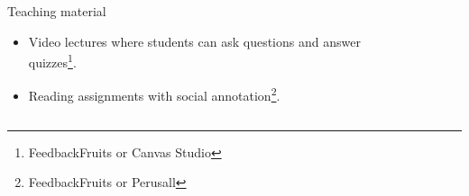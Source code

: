 \begin{frame}
  \begin{columns}
    \begin{column}{0.5\columnwidth}
      \begin{block}{Teaching material}
        \begin{itemize}
          \item<1> Video lectures where students can ask questions and answer 
            quizzes\footnote{FeedbackFruits or Canvas Studio}.

            \pause

          \item<2-3> Reading assignments with social annotation\footnote{%
              FeedbackFruits or Perusall
            }.
        \end{itemize}
      \end{block}
    \end{column}
    \begin{column}{0.5\columnwidth}
      \begin{figure}
        \centering

\end{figure}
\end{column}
\end{columns}
\end{frame}
